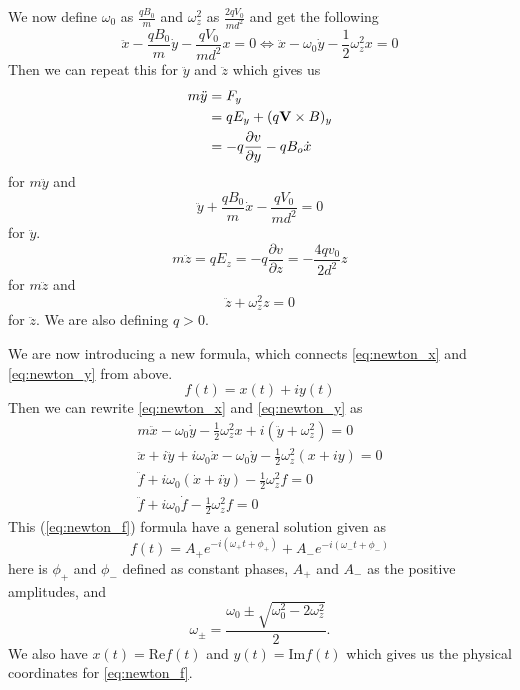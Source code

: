 \documentclass[english,notitlepage,reprint,nofootinbib]{revtex4-1}  %
\begin{document}
	We now define $\omega_0$ as $\frac{q B_0}{m}$ and $\omega_z^2$ as $\frac{2 q V_0}{md^2}$ and get the following
	\begin{equation} \label{eq:newton_x}
		\ddot{x} - \frac{q B_0}{m} \dot{y} - \frac{q V_0}{m d^2} x = 0 \Leftrightarrow \ddot{x} - \omega_0 \dot{y} - \frac{1}{2} \omega^2_z x = 0
	\end{equation}
	Then we can repeat this for $\ddot{y}$ and $\ddot{z}$ which gives us
	\begin{align*}
		m \ddot{y} &= F_y \\
		&= q E_y + (q \vectorbold{V} \times B)_y \\
		&= - q \frac{\partial v}{\partial y} - q B_o \dot{x}
	\end{align*}
	for $m \ddot{y}$ and 
	\begin{equation} \label{eq:newton_y}
		\ddot{y} + \frac{q B_0}{m} \dot{x} - \frac{q V_0}{m d^2} = 0
	\end{equation}
	for $\ddot{y}$.
	\begin{equation*}
		m \ddot{z} = q E_z = -q \frac{\partial v}{\partial z} = - \frac{4 q v_0}{2 d^2} z
	\end{equation*}
	for $m \ddot{z}$ and
	\begin{equation} \label{eq:newton_z}
		\ddot{z} + \omega^2_z z = 0
	\end{equation}
	for $\ddot{z}$. We are also defining $q > 0$.

	We are now introducing a new formula, which connects \ref{eq:newton_x} and \ref{eq:newton_y} from above.
	\begin{equation*}
		f(t) = x(t) + iy(t)
	\end{equation*}
	Then we can rewrite \ref{eq:newton_x} and \ref{eq:newton_y} as
	\begin{align} \label{eq:newton_f}
		m \ddot{x} - \omega_0 \dot{y} - \frac{1}{2} \omega_z^2 x + i(\ddot{y} + \omega_z^2) = 0 \nonumber \\
		\ddot{x} + i \ddot{y} + i \omega_0 \dot{x} - \omega_0 \dot{y} - \frac{1}{2} \omega_z^2 (x + iy) = 0 \nonumber \\
		\ddot{f} + i \omega_0 (\dot{x} + i \dot{y}) - \frac{1}{2} \omega_z^2 f = 0 \nonumber \\
		\ddot{f} + i \omega_0 \dot{f} - \frac{1}{2} \omega_z^2 f = 0
	\end{align}
	This (\ref{eq:newton_f}) formula have a general solution given as
	\begin{equation}
		f(t) = A_+ e^{-i(\omega_+ t + \phi_+)} + A_- e^{-i(\omega_- t + \phi_-)}
	\end{equation}
	here is $\phi_+$ and $\phi_-$ defined as constant phases, $A_+$ and $A_-$ as the positive amplitudes, and 
	\begin{equation*}
		\omega_\pm = \frac{\omega_0 \pm \sqrt{\omega_0^2 - 2\omega_z^2}}{2}.
	\end{equation*}
	We also have $x(t) = \text{Re} f(t)$ and $y(t) = \text{Im} f(t)$ which gives us the physical coordinates for \ref{eq:newton_f}.
	
\end{document}
